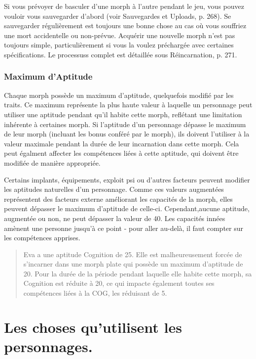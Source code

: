 Si vous prévoyer de basculer d'une morph à l'autre pendant le jeu, vous pouvez vouloir vous sauvegarder d'abord (voir Sauvegardes et Uploads, p. 268). Se sauvegarder régulièrement est toujours une bonne chose au cas où vous souffriez une mort accidentelle ou non-prévue. Acquérir une nouvelle morph n'est pas toujours simple, particulièrement si vous la voulez préchargée avec certaines spécifications. Le processuss complet est détaillée sous Réincarnation, p. 271. 

\subsubsection{Maximum d'Aptitude} \label{sec:aptitude-maximums} 

Chaque morph possède un maximum d'aptitude, quelquefois modifié par les traits. Ce maximum représente la plus haute valeur à laquelle un personnage peut utiliser une aptitude pendant qu'il habite cette morph, reflétant une limitation inhérente à certaines morph. Si l'aptitude d'un personnage dépasse le maximum de leur morph (incluant les bonus conféré par le morph), ils doivent l'utiliser à la valeur maximale pendant la durée de leur incarnation dans cette morph. Cela peut égalment affecter les compétences liées à cette aptitude, qui doivent être modifiée de manière appropriée. 

Certains implants, équipements, exploit psi ou d'autres facteurs peuvent modifier les aptitudes naturelles d'un personnage. Comme ces valeurs augmentées représentent des facteurs externe améliorant les capacités de la morph, elles peuvent dépasser le maximum d'aptitude de celle-ci. Cependant,aucune aptitude, augmentée ou non, ne peut dépasser la valeur de 40. Les capacités innées amènent une personne jusqu'à ce point - pour aller au-delà, il faut compter sur les compétences apprises. 

\begin{quotation} Eva a une aptitude Cognition de 25. Elle est malheureusement forcée de s'incarner dans une morph plate qui possède un maximum d'aptitude de 20. Pour la durée de la période pendant laquelle elle habite cette morph, sa Cognition est réduite à 20, ce qui impacte également toutes ses compétences liées à la COG, les réduisant de 5. \end{quotation} 

\section{Les choses qu'utilisent les personnages.} \label{sec:things-char-use} 


